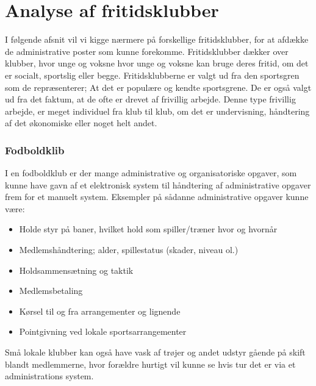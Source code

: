 \chapter{Analyse af fritidsklubber} \label{Fritidsklubber}

I følgende afsnit vil vi kigge nærmere på forskellige fritidsklubber, for at afdække de administrative poster som kunne forekomme. Fritidsklubber dækker over klubber, hvor unge og voksne hvor unge og voksne kan bruge deres fritid, om det er socialt, sportslig eller begge. Fritidsklubberne er valgt ud fra den sportsgren som de repræsenterer; At det er populære og kendte sportsgrene. De er også valgt ud fra det faktum, at de ofte er drevet af frivillig arbejde. Denne type frivillig arbejde, er meget individuel fra klub til klub, om det er undervisning, håndtering af det økonomiske eller noget helt andet. 


\subsection{Fodboldklib} \label{Fodbold}
I en fodboldklub er der mange administrative og organisatoriske opgaver, som kunne have gavn af et elektronisk system
til håndtering af administrative opgaver frem for et manuelt system. Eksempler på sådanne
administrative opgaver kunne være:

\begin{itemize}
\item Holde styr på baner, hvilket hold som spiller/træner hvor og hvornår
\item Medlemshåndtering; alder, spillestatus (skader, niveau ol.)
\item Holdsammensætning og taktik
\item Medlemsbetaling
\item Kørsel til og fra arrangementer og lignende
\item Pointgivning ved lokale sportsarrangementer
\end{itemize}

Små lokale klubber kan også have vask af trøjer og andet udstyr gående på skift blandt medlemmerne, hvor forældre hurtigt vil kunne se hvis tur det er via et administrations system. 

